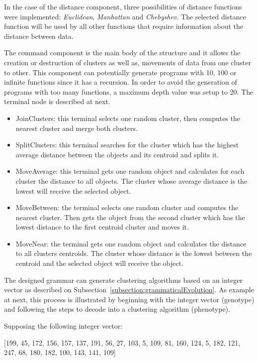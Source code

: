 \documentclass[conference,compsoc]{IEEEtran}
\begin{document}
In the case of the distance component, three possibilities of distance functions were implemented: \textit{Euclidean}, \textit{Manhattan} and \textit{Chebyshev}. The selected distance function will be used by all other functions that require information about the distance between data. 

The command component is the main body of the structure and it allows the creation or destruction of clusters as well as, movements of data from one cluster to other. This component can potentially generate programs with 10, 100 or infinite functions since it has a recursion. In order to avoid the generation of programs with too many functions, a maximum depth value was setup to 20. The terminal node is described at next.

\begin{itemize}
	\item JoinClusters: this terminal selects one random cluster, then computes the nearest cluster and merge both clusters.
	\item SplitClusters: this terminal searches for the cluster which has the highest average distance between the objects and its centroid and splits it. 
	\item MoveAverage:  this terminal gets one random object and calculates for each cluster the distance to all objects. The cluster whose average distance is the lowest will receive the selected object.
	\item MoveBetween: the terminal selects one random cluster and computes the nearest cluster. Then gets the object from the second cluster which has the lowest distance to the first centroid cluster and moves it.
	\item MoveNear:  the terminal gets one random object and calculates the distance to all clusters centroids. The cluster whose distance is the lowest between the centroid and the selected object will receive the object.
\end{itemize}

The designed grammar can generate clustering algorithms based on an integer vector as described on Subsection~\ref{subsection:grammaticalEvolution}. As example at next, this process is illustrated by beginning with the integer vector (genotype) and following the steps to decode into a clustering algorithm (phenotype). 

Supposing the following integer vector:

[199, 45, 172, 156, 157, 137, 191, 56, 27, 103, 5, 109, 81, 160, 124, 5, 182, 121, 247, 68, 180, 182, 100, 143, 141, 109]
\end{document}
